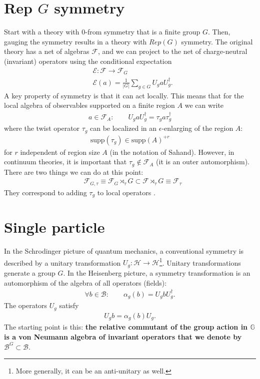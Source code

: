 \documentclass{article}
\newcommand{\mB}{\mathcal{B}}
\newcommand{\mF}{\mathcal{F}}
\newcommand{\mH}{\mathcal{H}}
\newcommand{\nn}{\nonumber}
\theoremstyle{definition}
\begin{document}
\section{Rep $G$ symmetry}

Start with a theory with $0$-from symmetry that is a finite group $G$. Then, gauging the symmetry results in a theory with $Rep(G)$ symmetry. The original theory has a net of algebras $\mathcal{F}$, and we can project to the net of charge-neutral (invariant) operators using the conditional expectation
\begin{align}
    &\mathcal{E}:\mF\to \mF_G\nn\\
    &\mathcal{E}(a)=\frac{1}{|G|}\sum_{g\in G}U_ga U_g^\dagger.
\end{align}
A key property of symmetry is that it can act locally. This means that for the local algebra of observables supported on a finite region $A$ we can write
\begin{align}
    a\in \mF_A:\qquad U_g a U_g^\dagger=\tau_g a \tau_g^\dagger
\end{align}
where the twist operator $\tau_g$ can be localized in an $\epsilon$-enlarging of the region $A$:
\begin{align}
    \text{supp}(\tau_g)\in \text{supp}(A)^{+r}
\end{align}
for $r$ independent of region size $A$ (in the notation of Sahand). However, in continuum theories, it is important that $\tau_g\notin \mF_A$ (it is an outer automorphism). There are two things we can do at this point:
\begin{align}
    &\mF_{G,\tau}\equiv \mathcal{F}_G\rtimes_{\tau}G\subset\mathcal{F}\rtimes_\tau G\equiv \mF_{\tau}
\end{align}
They correspond to adding $\tau_g$ to local operators . 



\section{Single particle}

  In the Schrodinger picture of quantum mechanics, a conventional symmetry is
  described by a unitary transformation $U_{g}:\mH\to \mH$\footnote{More
  generally, it can be an anti-unitary as well.}. Unitary transformations
  generate a group $G$. In the Heisenberg picture, a symmetry transformation is
  an automorphism of the algebra of all operators (fields):
  \begin{align}
    \forall b\in \mB:\qquad \alpha_{g}(b)=U_{g}b U_{g}^{\dagger}.
  \end{align}
  The operators $U_g$ satisfy
  \begin{align}
      U_g b=\alpha_g(b) U_g.
  \end{align}
The starting point is this: {\bf the relative commutant of the group action in $\mathbb{G}$ is a von Neumann algebra of invariant operators that we denote by $\mathcal{B}^G\subset \mathcal{B}$}. 
\end{document}
